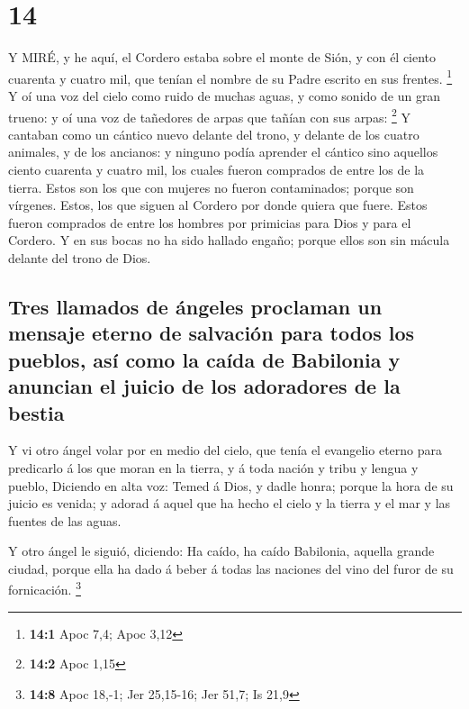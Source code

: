\hypertarget{section-13}{%
\section{14}\label{section-13}}

 Y MIRÉ, y he aquí, el Cordero estaba sobre el monte de
Sión, y con él ciento cuarenta y cuatro mil, que tenían el nombre de su
Padre escrito en sus frentes. \footnote{\textbf{14:1} Apoc 7,4; Apoc
  3,12}  Y oí una voz del cielo como ruido de muchas aguas,
y como sonido de un gran trueno: y oí una voz de tañedores de arpas que
tañían con sus arpas: \footnote{\textbf{14:2} Apoc 1,15}  Y
cantaban como un cántico nuevo delante del trono, y delante de los
cuatro animales, y de los ancianos: y ninguno podía aprender el cántico
sino aquellos ciento cuarenta y cuatro mil, los cuales fueron comprados
de entre los de la tierra.  Estos son los que con mujeres no
fueron contaminados; porque son vírgenes. Estos, los que siguen al
Cordero por donde quiera que fuere. Estos fueron comprados de entre los
hombres por primicias para Dios y para el Cordero.  Y en sus
bocas no ha sido hallado engaño; porque ellos son sin mácula delante del
trono de Dios.

\hypertarget{tres-llamados-de-uxe1ngeles-proclaman-un-mensaje-eterno-de-salvaciuxf3n-para-todos-los-pueblos-asuxed-como-la-cauxedda-de-babilonia-y-anuncian-el-juicio-de-los-adoradores-de-la-bestia}{%
\subsection{Tres llamados de ángeles proclaman un mensaje eterno de
salvación para todos los pueblos, así como la caída de Babilonia y
anuncian el juicio de los adoradores de la
bestia}\label{tres-llamados-de-uxe1ngeles-proclaman-un-mensaje-eterno-de-salvaciuxf3n-para-todos-los-pueblos-asuxed-como-la-cauxedda-de-babilonia-y-anuncian-el-juicio-de-los-adoradores-de-la-bestia}}

 Y vi otro ángel volar por en medio del cielo, que tenía el
evangelio eterno para predicarlo á los que moran en la tierra, y á toda
nación y tribu y lengua y pueblo,  Diciendo en alta voz:
Temed á Dios, y dadle honra; porque la hora de su juicio es venida; y
adorad á aquel que ha hecho el cielo y la tierra y el mar y las fuentes
de las aguas.

 Y otro ángel le siguió, diciendo: Ha caído, ha caído
Babilonia, aquella grande ciudad, porque ella ha dado á beber á todas
las naciones del vino del furor de su fornicación. \footnote{\textbf{14:8}
  Apoc 18,-1; Jer 25,15-16; Jer 51,7; Is 21,9}

